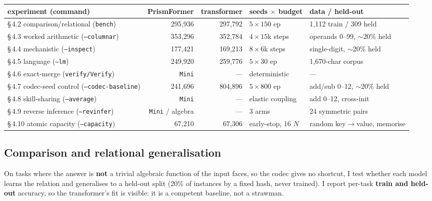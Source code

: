 \documentclass[11pt]{article}
\newcommand{\code}[1]{\texttt{#1}}
\begin{document}
\begin{center}
\begin{tabular}{@{}lrrll@{}}
\toprule
experiment (command) & PrismFormer & transformer & seeds $\times$ budget & data / held-out \\
\midrule
\S\,4.2 comparison/relational (\code{bench}) & 295{,}936 & 297{,}792 & $5\times150$ ep & 1{,}112 train / 309 held \\
\S\,4.3 worked arithmetic (\code{--columnar}) & 353{,}296 & 352{,}784 & $4\times15$k steps & operands 0--99, $\sim$20\% held \\
\S\,4.4 mechanistic (\code{--inspect}) & 177{,}421 & 169{,}213 & $8\times6$k steps & single-digit, $\sim$20\% held \\
\S\,4.5 language (\code{--lm}) & 249{,}920 & 259{,}776 & $5\times30$ ep & 1{,}670-char corpus \\
\S\,4.6 exact-merge (\code{verify/Verify}) & \code{Mini} & --- & deterministic & --- \\
\S\,4.7 codec-seed control (\code{--codec-baseline}) & 241{,}696 & 804{,}896 & $5\times800$ ep & add/sub 0--12, $\sim$20\% held \\
\S\,4.8 skill-sharing (\code{--average}) & \code{Mini} & --- & elastic coupling & add 0--12, cross-init \\
\S\,4.9 reverse inference (\code{--revinfer}) & \code{Mini} / algebra & --- & 3 arms & 24 symmetric pairs \\
\S\,4.10 atomic capacity (\code{--capacity}) & 67{,}210 & 67{,}306 & early-stop, 16 $N$ & random key$\to$value, memorise \\
\bottomrule
\end{tabular}
\end{center}

\subsection{Comparison and relational generalisation}\label{sec:relational}

On tasks where the answer is \textbf{not} a trivial algebraic function of the input faces, so the codec
gives no shortcut, I test whether each model learns the relation and generalises to a held-out split
(20\% of instances by a fixed hash, never trained). I report per-task \textbf{train and held-out}
accuracy, so the transformer's fit is visible: it is a competent baseline, not a strawman.
\end{document}
